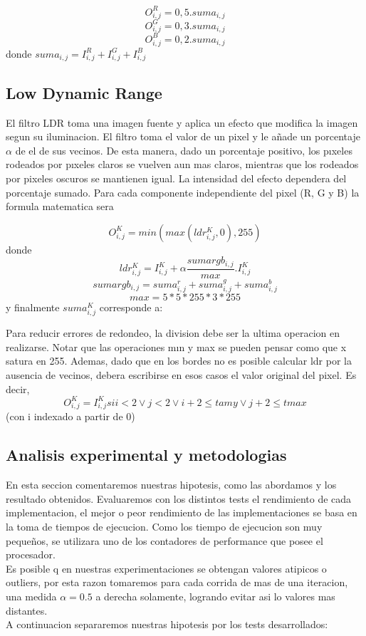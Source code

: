 $$O_{i,j}^{R} = 0, 5 . suma_{i,j}$$
$$O_{i,j}^{G} = 0, 3 . suma_{i,j}$$
$$O_{i,j}^{B} = 0, 2 . suma_{i,j}$$
donde $suma_{i,j} = I_{i,j}^{R} + I_{i,j}^{G} + I_{i,j}^{B}$
\subsection{Low Dynamic Range}
El filtro LDR toma una imagen fuente y aplica un efecto que modifica la imagen segun su iluminacion. El filtro toma el valor de un pixel y le añade un porcentaje $\alpha$ de el de sus vecinos.
De esta manera, dado un porcentaje positivo, los pıxeles rodeados por pıxeles claros se vuelven
aun mas claros, mientras que los rodeados por pixeles oscuros se mantienen igual. La intensidad
del efecto dependera del porcentaje sumado.
Para cada componente independiente del pixel (R, G y B) la formula matematica sera

$$O_{i,j}^{K} = min(max(ldr_{i,j}^{K},0),255)$$
donde
$$ldr_{i,j}^{K} = I_{i,j}^{K} + \alpha \frac{sumargb_{i,j}}{max} . I_{i,j}^{K}$$
$$sumargb_{i,j} = suma_{i,j}^{r} + suma_{i,j}^{g} + suma_{i,j}^{b}$$
$$max = 5*5*255*3*255$$
y finalmente $suma_{i,j}^{K}$ corresponde a:



Para reducir errores de redondeo, la division debe ser la ultima operacion en realizarse.
Notar que las operaciones mın y max se pueden pensar como que x satura en 255.
Ademas, dado que en los bordes no es posible calcular ldr por la ausencia de vecinos, debera
escribirse en esos casos el valor original del pixel. Es decir,
$$O_{i,j}^{K} = I_{i,j}^{K} si i<2 \vee j<2 \vee i+2 \leq tamy \vee j +2 \leq tmax$$
(con i indexado a partir de 0)
\subsection{Analisis experimental y metodologias}
En esta seccion comentaremos nuestras hipotesis, como las abordamos y los resultado obtenidos. Evaluaremos con los distintos tests el rendimiento de cada implementacion, el mejor o peor rendimiento de las implementaciones se basa en la toma de tiempos de ejecucion. Como los tiempo de ejecucion son muy pequeños, se utilizara uno de los contadores de performance que posee el procesador.\\ Es posible q en nuestras experimentaciones se obtengan valores atipicos o outliers, por esta razon tomaremos para cada corrida de mas de una iteracion, una medida $\alpha = 0.5$ a derecha solamente, logrando evitar asi lo valores mas distantes.\\
A continuacion separaremos nuestras hipotesis por los tests desarrollados:

